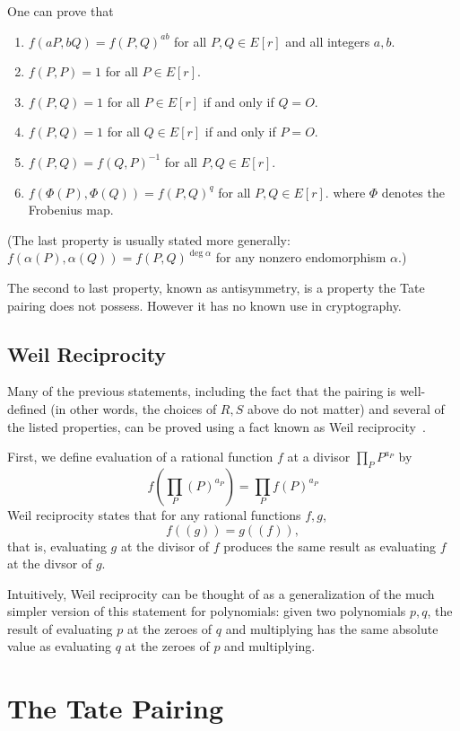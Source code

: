 One can prove that
\begin{enumerate}
\item
$f(a P, b Q) = f(P,Q)^{a b}$ for all $P, Q \in E[r]$ and all integers $a, b$.
\item
$f(P,P) = 1$ for all $P \in E[r]$.
\item
$f(P,Q) = 1$ for all $P \in E[r]$ if and only if $Q = O$.
\item
$f(P,Q) = 1$ for all $Q \in E[r]$ if and only if $P = O$.
\item
$f(P,Q) = f(Q,P)^{-1}$ for all $P,Q \in E[r]$.
\item
$f(\Phi(P),\Phi(Q)) = f(P,Q)^{q}$ for all $P,Q \in E[r]$.
where $\Phi$ denotes the Frobenius map.
\end{enumerate}

(The last property is usually stated more generally:
$f(\alpha(P),\alpha(Q)) = f(P,Q)^{\deg \alpha}$ for any nonzero
endomorphism $\alpha$.)

The second to last property, known as antisymmetry, is a property the
Tate pairing does not possess. However it has no known use in cryptography.

\subsection {Weil Reciprocity}

Many of the previous statements, including the fact that the pairing is
well-defined (in other words, the choices of $R,S$ above do not matter) and
several of the listed properties, can be proved using a fact known as Weil
reciprocity~\cite{bf}.

First, we define evaluation of a rational function $f$
at a divisor $\prod_P P^{a_P}$  by
\[ f( \prod_P (P)^{a_P} ) = \prod_P f(P)^{a_P} \]
Weil reciprocity states that
for any rational functions $f, g$,
\[f((g)) = g((f)) , \]
that is, evaluating $g$ at the divisor of $f$ produces the
same result as evaluating $f$ at the divsor of $g$.

Intuitively, Weil reciprocity can be thought of as a generalization of the much
simpler version of this statement for polynomials: given two polynomials $p,
q$, the result of evaluating $p$ at the zeroes of $q$ and multiplying has the
same absolute value as evaluating $q$ at the zeroes of $p$ and multiplying.

\section {The Tate Pairing }

